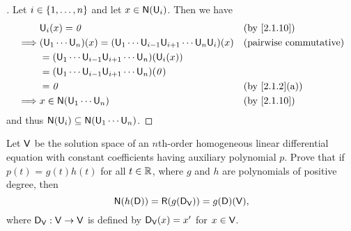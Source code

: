 \begin{proof}[]
	Let \(i \in \left\lbrace1, \dots, n\right\rbrace\) and let \(x \in \ns{\U_i}\).
	Then we have
	\begin{align*}
		         & \U_i(x) = \zv                                                                   &  & \by{2.1.10}                   \\
		\implies & (\U_1 \cdots \U_n)(x) = (\U_1 \cdots \U_{i - 1} \U_{i + 1} \cdots \U_n \U_i)(x) &  & \text{(pairwise commutative)} \\
		         & = (\U_1 \cdots \U_{i - 1} \U_{i + 1} \cdots \U_n)(\U_i(x))                                                         \\
		         & = (\U_1 \cdots \U_{i - 1} \U_{i + 1} \cdots \U_n)(\zv)                                                             \\
		         & = \zv                                                                           &  & \by{2.1.2}[a]                 \\
		\implies & x \in \ns{\U_1 \cdots \U_n}                                                     &  & \by{2.1.10}
	\end{align*}
	and thus \(\ns{\U_i} \subseteq \ns{\U_1 \cdots \U_n}\).
\end{proof}

\setcounter{ex}{11}
\begin{ex}\label{ex:2.7.12}
	Let \(\mathsf{V}\) be the solution space of an \(n\)th-order homogeneous linear differential equation with constant coefficients having auxiliary polynomial \(p\).
	Prove that if \(p(t)\) = \(g(t) h(t)\) for all \(t \in \mathbb{R}\), where \(g\) and \(h\) are polynomials of positive degree, then
	\[
		\ns{h(\Dop)} = \rg{g(\Dop_{\V})} = g(\Dop)(\V),
	\]
	where \(\mathsf{D}_{\mathsf{V}} : \mathsf{V} \to \mathsf{V}\) is defined by \(\mathsf{D}_{\mathsf{V}}(x) = x'\) for \(x \in \mathsf{V}\).
\end{ex}

